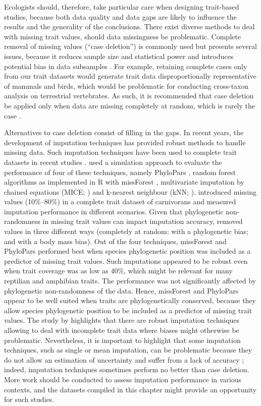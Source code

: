 Ecologists should, therefore, take particular care when designing trait-based studies, because both data quality and data gaps are likely to influence the results and the generality of the conclusions. There exist diverse methods to deal with missing trait values, should data missingness be problematic. Complete removal of missing values (“case deletion”) is commonly used but presents several issues, because it reduces sample size and statistical power and introduces potential bias in data subsamples \citep{Nakagawa2008}. For example, retaining complete cases only from our trait datasets would generate trait data disproportionally representative of mammals and birds, which would be problematic for conducting cross-taxon analysis on terrestrial vertebrates. As such, it is recommended that case deletion be applied only when data are missing completely at random, which is rarely the case \citep{Peugh2004}.

Alternatives to case deletion consist of filling in the gaps. In recent years, the development of imputation techniques has provided robust methods to handle missing data. Such imputation techniques have been used to complete trait datasets in recent studies \citep{Cooke2019b}. \citet{Penone2014} used a simulation approach to evaluate the performance of four of these techniques, namely PhyloPars \citep{Bruggeman2009}, random forest algorithms as implemented in R with missForest \citep{Stekhoven2016, Stekhoven2012}, multivariate imputation by chained equations (MICE; \citet{micepackage}) and k-nearest neighbour (kNN; \citet{Troyanskaya2001}). \citet{Penone2014} introduced missing values (10\%–80\%) in a complete trait dataset of carnivorans and measured imputation performance in different scenarios. Given that phylogenetic non-randomness in missing trait values can impact imputation accuracy, \citet{Penone2014} removed values in three different ways (completely at random; with a phylogenetic bias; and with a body mass bias). Out of the four techniques, missForest and PhyloPars performed best when species phylogenetic position was included as a predictor of missing trait values. Such imputations appeared to be robust even when trait coverage was as low as 40\%, which might be relevant for many reptilian and amphibian traits. The performance was not significantly affected by phylogenetic non-randomness of the data. Hence, missForest and PhyloPars appear to be well suited when traits are phylogenetically conserved, because they allow species phylogenetic position to be included as a predictor of missing trait values. The study by \citet{Penone2014} highlights that there are robust imputation techniques allowing to deal with incomplete trait data where biases might otherwise be problematic. Nevertheless, it is important to highlight that some imputation techniques, such as single or mean imputation, can be problematic because they do not allow an estimation of uncertainty and suffer from a lack of accuracy \citep{Nakagawa2008}; indeed, imputation techniques sometimes perform no better than case deletion. More work should be conducted to assess imputation performance in various contexts, and the datasets compiled in this chapter might provide an opportunity for such studies.

